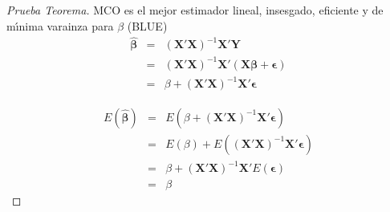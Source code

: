 %
%
%

\begin{proof}[Prueba Teorema]
	MCO es el mejor estimador lineal, insesgado, eficiente y de m\'\i{}nima
	varainza para $\beta$ (BLUE) 
	\begin{eqnarray*}
		\hat{\mathbf{\beta}} & = & (\mathbf{X'X})^{-1}\mathbf{X'Y}\\
		& = & (\mathbf{X'X})^{-1}\mathbf{X'}\left(\mathbf{X\beta}+\mathbf{\mathbf{\epsilon}}\right)\\
		& = & \beta+(\mathbf{X'X})^{-1}\mathbf{X'}\mathbf{\mathbf{\epsilon}}
	\end{eqnarray*}
	
	\begin{eqnarray*}
		E\left(\hat{\mathbf{\beta}}\right) & = & E\left(\beta+(\mathbf{X'X})^{-1}\mathbf{X'}\mathbf{\mathbf{\epsilon}}\right)\\
		& = & E\left(\beta\right)+E\left((\mathbf{X'X})^{-1}\mathbf{X'}\mathbf{\mathbf{\epsilon}}\right)\\
		& = & \beta+(\mathbf{X'X})^{-1}\mathbf{X'}E\mathbf{\left(\mathbf{\epsilon}\right)}\\
		& = & \beta
	\end{eqnarray*}
\end{proof}

